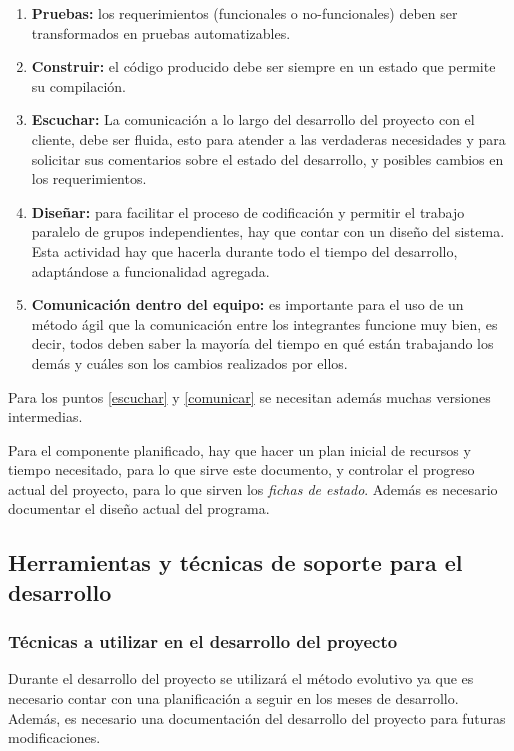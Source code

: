 \documentclass[letterpaper,spanish,10pt]{article}
\begin{document}
\begin{enumerate}
\item \textbf{Pruebas:} los requerimientos (funcionales o no-funcionales) deben
  ser transformados en pruebas automatizables.
\item \textbf{Construir:} el c\'odigo producido debe ser siempre en un
  estado que permite su compilaci\'on.
\item \label{escuchar} \textbf{Escuchar:} La comunicaci\'on a lo largo del desarrollo del proyecto
con el cliente, debe ser fluida, esto para atender a las 
  verdaderas necesidades y para solicitar sus comentarios sobre el
  estado del desarrollo, y posibles cambios en los requerimientos.
\item \textbf{Dise\~nar:} para facilitar el proceso de codificaci\'on y permitir el
  trabajo paralelo de grupos independientes, hay que contar con un
  dise\~no del sistema.
  Esta actividad hay que hacerla durante todo el tiempo del desarrollo,
  adapt\'andose a funcionalidad agregada.
\item \label{comunicar} \textbf{Comunicaci\'on dentro del equipo:} es importante
  para el uso de un m\'etodo \'agil que la comunicaci\'on entre los integrantes funcione
  muy bien, es decir, todos deben saber la mayor\'ia del tiempo en qu\'e
  est\'an trabajando los dem\'as y cu\'ales son los cambios realizados por
  ellos.
\end{enumerate}

Para los puntos \ref{escuchar} y \ref{comunicar} se necesitan adem\'as
muchas versiones intermedias.

Para el componente planificado, hay que hacer un plan inicial de
recursos y tiempo necesitado, para lo que sirve este documento, y
controlar el progreso actual del proyecto, para lo que sirven los
\emph{fichas de estado}.
Adem\'as es necesario documentar el dise\~no actual del programa.



\subsection{Herramientas y t\'ecnicas de soporte para el desarrollo}
\subsubsection{T\'ecnicas a utilizar en el desarrollo del proyecto}

Durante el desarrollo del proyecto se utilizar\'a el m\'etodo evolutivo ya que es necesario contar con una planificaci\'on a seguir en los meses de desarrollo. Adem\'as, es necesario una documentaci\'on del desarrollo del proyecto para futuras modificaciones.\\
\end{document}
